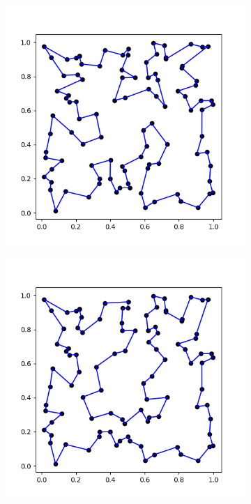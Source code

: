 \documentclass{article}
\begin{document}
\begin{figure}[h]
	\centering
	\begin{subfigure}[t]{0.28\linewidth}
		\centering
		\includegraphics[width = 1.0\linewidth, trim={20 20 30 30}, clip=true]{figures/optimum_2.png}
		\label{fig:comp1el}	
	\end{subfigure}%
	\hspace{0.1\linewidth}
	\begin{subfigure}[t]{0.28\linewidth}
		\centering
		\includegraphics[width = 1.0\linewidth, trim={20 20 30 30}, clip=true]{figures/orig_citiesmin.png}

\end{subfigure}
\end{figure}
\end{document}
